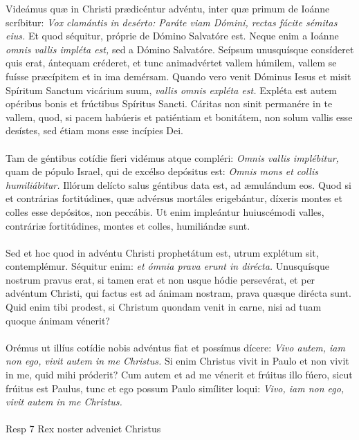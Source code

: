 \documentclass[options]{article}
\begin{document}
	Videámus quæ in Christi prædicéntur advéntu, inter quæ primum de Ioánne scríbitur: \emph{Vox clamántis in desérto: Paráte viam Dómini, rectas fácite sémitas eius.} Et quod séquitur, próprie de Dómino Salvatóre est. Neque enim a Ioánne \emph{omnis vallis impléta est,} sed a Dómino Salvatóre. Seípsum unusquísque consíderet quis erat, ántequam créderet, et tunc animadvértet vallem húmilem, vallem se fuísse præcípitem et in ima demérsam. Quando vero venit Dóminus Iesus et misit Spíritum Sanctum vicárium suum, \emph{vallis omnis expléta est.} Expléta est autem opéribus bonis et frúctibus Spíritus Sancti. Cáritas non sinit permanére in te vallem, quod, si pacem habúeris et patiéntiam et bonitátem, non solum vallis esse desístes, sed étiam mons esse incípies Dei.\\\\	
	Tam de géntibus cotídie fíeri vidémus atque compléri: \emph{Omnis vallis implébitur,} quam de pópulo Israel, qui de excélso depósitus est: \emph{Omnis mons et collis humiliábitur.} Illórum delícto salus géntibus data est, ad æmulándum eos. Quod si et contrárias fortitúdines, quæ advérsus mortáles erigebántur, díxeris montes et colles esse depósitos, non peccábis. Ut enim impleántur huiuscémodi valles, contráriæ fortitúdines, montes et colles, humiliándæ sunt.\\\\
	Sed et hoc quod in advéntu Christi prophetátum est, utrum explétum sit, contemplémur. Séquitur enim: \emph{et ómnia prava erunt in dirécta.} Unusquísque nostrum pravus erat, si tamen erat et non usque hódie persevérat, et per advéntum Christi, qui factus est ad ánimam nostram, prava quæque dirécta sunt. Quid enim tibi prodest, si Christum quondam venit in carne, nisi ad tuam quoque ánimam vénerit?\\
	\\
	Orémus ut illíus cotídie nobis advéntus fiat et possímus dícere: \emph{Vivo autem, iam non ego, vivit autem in me Christus.} Si enim Christus vivit in Paulo et non vivit in me, quid mihi próderit? Cum autem et ad me vénerit et frúitus illo fúero, sicut frúitus est Paulus, tunc et ego possum Paulo simíliter loqui: \emph{Vivo, iam non ego, vivit autem in me Christus.}\\\\
	Resp 7 Rex noster adveniet Christus
\end{document}
